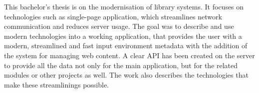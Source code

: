 \documentclass[12pt]{report}
\begin{document}
This bachelor's thesis is on the modernisation of library systems.
It focuses on technologies such as single-page application, which streamlines
network communication and reduces server usage.
The goal was to describe and use modern technologies into a working application,
that provides the user with a modern, streamlined and fast input environment
metadata with the addition of the system for managing web content.
A clear API has been created on the server to provide all the data not only for the
main application, but for the related modules or other projects as well.
The work also describes the technologies that make these
streamlinings possible.
\end{document}
